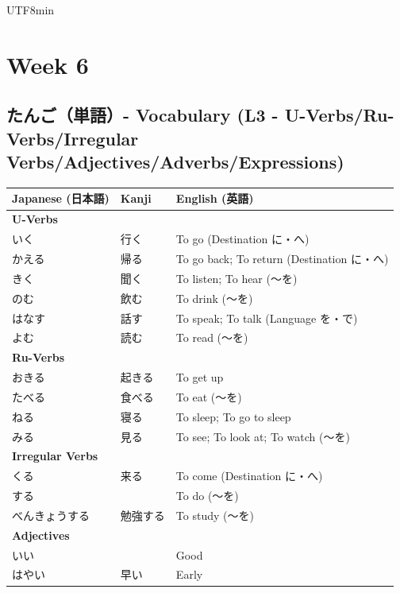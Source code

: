 \documentclass[11pt]{article}
\begin{document}
\begin{CJK}{UTF8}{min}

\newpage
\section{Week 6}

\subsection{たんご（単語）- Vocabulary (L3 - U-Verbs/Ru-Verbs/Irregular Verbs/Adjectives/Adverbs/Expressions)}
\begin{tabularx}{\linewidth}{X | X | X}
    \toprule
    \textbf{Japanese (日本語)} & \textbf{Kanji} & \textbf{English (英語)} \\
    \midrule
    \textbf{U-Verbs} &  & \\
    いく & 行く & To go (Destination に・へ) \\
    かえる & 帰る & To go back; To return (Destination に・へ) \\
    きく & 聞く & To listen; To hear (〜を) \\
    のむ & 飲む & To drink (〜を) \\
    はなす & 話す & To speak; To talk (Language を・で) \\
    よむ & 読む & To read (〜を) \\
    \hline
    \textbf{Ru-Verbs} & & \\
    おきる & 起きる & To get up \\
    たべる & 食べる & To eat (〜を) \\
    ねる & 寝る & To sleep; To go to sleep \\
    みる & 見る & To see; To look at; To watch (〜を) \\
    \hline
    \textbf{Irregular Verbs} &  & \\
    くる & 来る & To come (Destination に・へ) \\
    する &  & To do (〜を) \\
    べんきょうする & 勉強する & To study (〜を) \\
    \hline
    \textbf{Adjectives} &  & \\
    いい &  & Good \\
    はやい & 早い & Early \\
    \hline

\end{tabularx}
\end{CJK}
\end{document}
